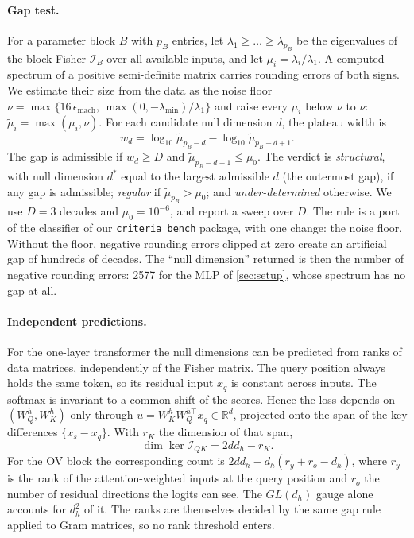 \documentclass[11pt,a4paper]{article}
\theoremstyle{definition}
\newcommand{\R}{\mathbb{R}}
\newcommand{\Fis}{\mathcal{I}}
\newcommand{\code}[1]{\texttt{#1}}
\begin{document}
\paragraph{Gap test.} For a parameter block $B$ with $p_B$ entries, let
$\lambda_1\ge\dots\ge\lambda_{p_B}$ be the eigenvalues of the block Fisher $\Fis_B$
over all available inputs, and let $\mu_i=\lambda_i/\lambda_1$. A computed spectrum of a
positive semi-definite matrix carries rounding errors of both signs. We estimate their
size from the data as the noise floor
$\nu=\max\{16\,\epsilon_{\mathrm{mach}},\,\max(0,-\lambda_{\min})/\lambda_1\}$ and raise
every $\mu_i$ below $\nu$ to $\nu$: $\tilde\mu_i=\max(\mu_i,\nu)$. For each candidate
null dimension $d$, the plateau width is
\[
w_d=\log_{10}\tilde\mu_{p_B-d}-\log_{10}\tilde\mu_{p_B-d+1}.
\]
The gap is admissible if $w_d\ge D$ and $\tilde\mu_{p_B-d+1}\le\mu_0$. The verdict is
\emph{structural}, with null dimension $d^\ast$ equal to the largest admissible $d$
(the outermost gap), if any gap is admissible; \emph{regular} if
$\tilde\mu_{p_B}>\mu_0$; and \emph{under-determined} otherwise. We use $D=3$ decades and
$\mu_0=10^{-6}$, and report a sweep over $D$. The rule is a port of the classifier of our \code{criteria\_bench} package, with one
change: the noise floor. Without the floor, negative rounding
errors clipped at zero create an artificial gap of hundreds of decades. The ``null
dimension'' returned is then the number of negative rounding errors: 2577 for the MLP
of \cref{sec:setup}, whose spectrum has no gap at all.

\paragraph{Independent predictions.} For the one-layer transformer the null dimensions
can be predicted from ranks of data matrices, independently of the Fisher matrix. The
query position always holds the same token, so its residual input $x_q$ is constant
across inputs. The softmax is invariant to a common shift of the scores. Hence the loss
depends on $(W_Q^h,W_K^h)$ only through $u=W_K^hW_Q^{h\top}x_q\in\R^{d}$, projected
onto the span of the key differences $\{x_s-x_q\}$. With $r_K$ the dimension of that
span,
\begin{equation}
\dim\ker\Fis_{QK}=2dd_h-r_K .
\label{eq:qknull}
\end{equation}
For the OV block the corresponding count is $2dd_h-d_h(r_y+r_o-d_h)$, where $r_y$ is the
rank of the attention-weighted inputs at the query position and $r_o$ the number of
residual directions the logits can see. The $GL(d_h)$ gauge alone accounts for $d_h^2$
of it. The ranks are themselves decided by the same gap rule applied to Gram matrices,
so no rank threshold enters.
\end{document}
